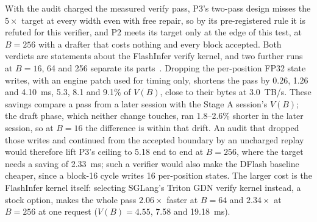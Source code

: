 With the audit charged the measured verify pass, P3's two-pass design misses the $5\times$ target at every width even with free repair, so by its pre-registered rule it is refuted for this verifier, and P2 meets its target only at the edge of this test, at $B=256$ with a drafter that costs nothing and every block accepted. Both verdicts are statements about the FlashInfer verify kernel, and two further runs at $B=16$, 64 and 256 separate its parts~. Dropping the per-position FP32 state writes, with an engine patch used for timing only, shortens the pass by 0.26, 1.26 and 4.10~ms, 5.3, 8.1 and 9.1\% of $V(B)$, close to their bytes at 3.0~TB/s. These savings compare a pass from a later session with the Stage A session's $V(B)$; the draft phase, which neither change touches, ran 1.8--2.6\% shorter in the later session, so at $B=16$ the difference is within that drift. An audit that dropped those writes and continued from the accepted boundary by an uncharged replay would therefore lift P3's ceiling to 5.18 end to end at $B=256$, where the target needs a saving of 2.33~ms; such a verifier would also make the DFlash baseline cheaper, since a block-16 cycle writes 16 per-position states. The larger cost is the FlashInfer kernel itself: selecting SGLang's Triton GDN verify kernel instead, a stock option, makes the whole pass $2.06\times$ faster at $B=64$ and $2.34\times$ at $B=256$ at one request ($V(B)=4.55$, 7.58 and 19.18~ms).

